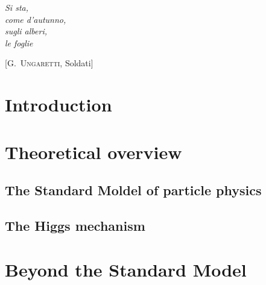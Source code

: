 \documentclass[10pt,twoside,cucitura,classica,english,openany]{toptesi}
\begin{document}



\english

\cleardoublepage

\frontespizio
\paginavuota
\begin{dedica}
\end{dedica}

\ringraziamenti

\tablespagetrue\figurespagetrue \indici

\begin{citazioni}
  \textit{Si sta,\\come d'autunno,\\sugli alberi,\\le foglie }

  [\textsc{G.~Ungaretti}, Soldati]
\end{citazioni}


\chapter*{Introduction}
\label{cha:intro}


\mainmatter



\chapter{Theoretical overview}
\label{cha:theoretical-overview}

\section{The Standard Moldel of particle physics}
\label{sec:stand-mold-part}



\section{The Higgs mechanism}
\label{sec:higgs-mechanism}



\chapter{Beyond the Standard Model}
\label{cha:beyond-stand-model}
\end{document}
